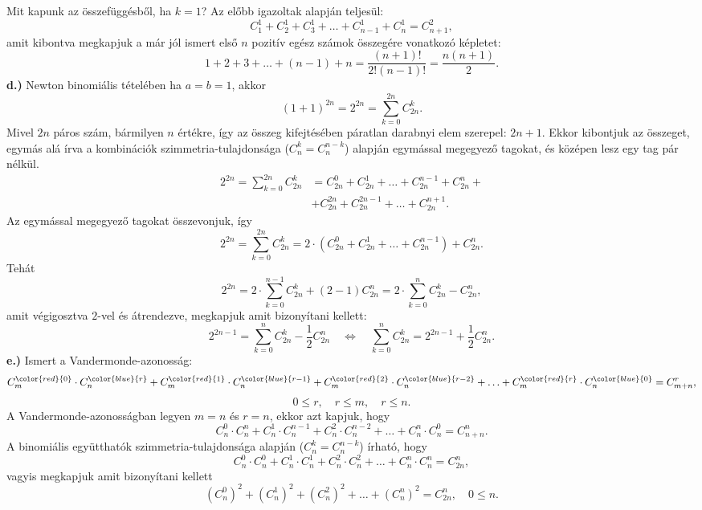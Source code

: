 \begin{solution}
\vspace{0.15cm}
 Mit kapunk az összefüggésből, ha $k=1$? Az előbb igazoltak alapján
teljesül: 
\[
C_{1}^{1}+C_{2}^{1}+C_{3}^{1}+\ldots+C_{n-1}^{1}+C_{n}^{1}=C_{n+1}^{2},
\]
amit kibontva megkapjuk a már jól ismert első $n$ pozitív egész számok
összegére vonatkozó képletet: 
\[
1+2+3+\ldots+(n-1)+n=\frac{(n+1)!}{2!(n-1)!}=\frac{n(n+1)}{2}.
\]
\textbf{d.)} Newton binomiális tételében ha $a=b=1$, akkor 
\[
(1+1)^{2n}=2^{2n}=\sum_{k=0}^{2n}C_{2n}^{k}.
\]
Mivel $2n$ páros szám, bármilyen $n$ értékre, így az összeg kifejtésében
páratlan darabnyi elem szerepel: $2n+1$. Ekkor kibontjuk az összeget,
egymás alá írva a kombinációk szimmetria-tulajdonsága (${\displaystyle C_{n}^{k}=C_{n}^{n-k}}$)
alapján egymással megegyező tagokat, és középen lesz egy tag pár nélkül.
\begin{align*}
2^{2n}=\sum_{k=0}^{2n}C_{2n}^{k} & =C_{2n}^{0}+C_{2n}^{1}+\ldots+C_{2n}^{n-1}+C_{2n}^{n}+\\
 & +C_{2n}^{2n}+C_{2n}^{2n-1}+\ldots+C_{2n}^{n+1}.
\end{align*}
Az egymással megegyező tagokat összevonjuk, így 
\[
2^{2n}=\sum_{k=0}^{2n}C_{2n}^{k}=2\cdot(C_{2n}^{0}+C_{2n}^{1}+\ldots+C_{2n}^{n-1})+C_{2n}^{n}.
\]
Tehát 
\[
2^{2n}=2\cdot\sum_{k=0}^{n-1}C_{2n}^{k}+(2-1)C_{2n}^{n}=2\cdot\sum_{k=0}^{n}C_{2n}^{k}-C_{2n}^{n},
\]
amit végigosztva $2$-vel és átrendezve, megkapjuk amit bizonyítani
kellett: 
\[
2^{2n-1}=\sum_{k=0}^{n}C_{2n}^{k}-\frac{1}{2}C_{2n}^{n}\quad\iff\quad\sum_{k=0}^{n}C_{2n}^{k}=2^{2n-1}+\frac{1}{2}C_{2n}^{n}.
\]
\textbf{e.)} Ismert a Vandermonde-azonosság: 
\[
C_{m}^{{\color{red}{0}}}\cdot C_{n}^{{\color{blue}{r}}}+C_{m}^{{\color{red}{1}}}\cdot C_{n}^{{\color{blue}{r-1}}}+C_{m}^{{\color{red}{2}}}\cdot C_{n}^{{\color{blue}{r-2}}}+\ldots+C_{m}^{{\color{red}{r}}}\cdot C_{n}^{{\color{blue}{0}}}=C_{m+n}^{r},
\]
\[
0\leq r,\quad r\leq m,\quad r\leq n.
\]
A Vandermonde-azonosságban legyen $m=n$ és $r=n$, ekkor azt kapjuk,
hogy 
\[
C_{n}^{0}\cdot C_{n}^{n}+C_{n}^{1}\cdot C_{n}^{n-1}+C_{n}^{2}\cdot C_{n}^{n-2}+\ldots+C_{n}^{n}\cdot C_{n}^{0}=C_{n+n}^{n}.
\]
A binomiális együtthatók szimmetria-tulajdonsága alapján (${\displaystyle C_{n}^{k}=C_{n}^{n-k}}$)
írható, hogy 
\[
C_{n}^{0}\cdot C_{n}^{0}+C_{n}^{1}\cdot C_{n}^{1}+C_{n}^{2}\cdot C_{n}^{2}+\ldots+C_{n}^{n}\cdot C_{n}^{n}=C_{2n}^{n},
\]
vagyis megkapjuk amit bizonyítani kellett 
\[
{\displaystyle (C_{n}^{0})^{2}+(C_{n}^{1})^{2}+(C_{n}^{2})^{2}+\ldots+(C_{n}^{n})^{2}=C_{2n}^{n},\quad0\leq n.}
\]
\end{solution}
\vspace{0.3cm}

